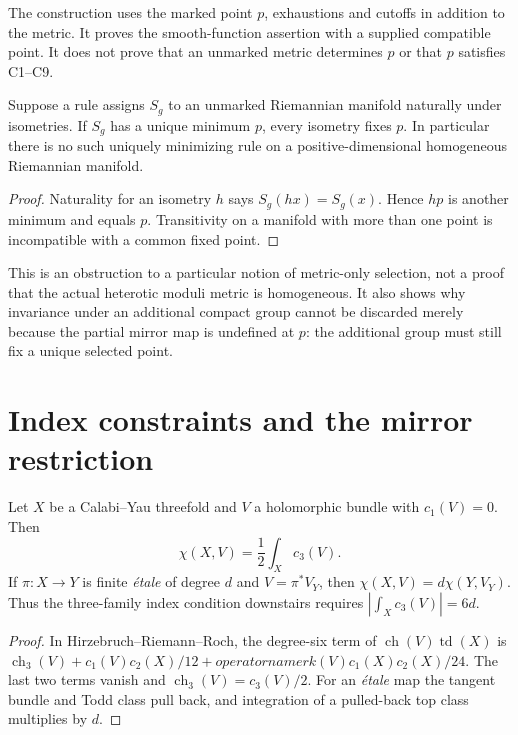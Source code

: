 \begin{remark}
The construction uses the marked point $p$, exhaustions and cutoffs in
addition to the metric. It proves the smooth-function assertion with a
supplied compatible point. It does not prove that an unmarked metric
determines $p$ or that $p$ satisfies C1--C9.
\end{remark}

\begin{proposition}
Suppose a rule assigns $S_g$ to an unmarked Riemannian manifold naturally
under isometries. If $S_g$ has a unique minimum $p$, every isometry fixes
$p$. In particular there is no such uniquely minimizing rule on a
positive-dimensional homogeneous Riemannian manifold.
\end{proposition}
\begin{proof}
Naturality for an isometry $h$ says $S_g(hx)=S_g(x)$. Hence $hp$ is
another minimum and equals $p$. Transitivity on a manifold with more
than one point is incompatible with a common fixed point.
\end{proof}
This is an obstruction to a particular notion of metric-only selection,
not a proof that the actual heterotic moduli metric is homogeneous.
It also shows why invariance under an additional compact group cannot be
discarded merely because the partial mirror map is undefined at $p$:
the additional group must still fix a unique selected point.

\section{Index constraints and the mirror restriction}
\begin{proposition}\label{prop:index}
Let $X$ be a Calabi--Yau threefold and $V$ a holomorphic bundle with
$c_1(V)=0$. Then
\[
 \chi(X,V)=\frac12\int_Xc_3(V).
\]
If $\pi:X\to Y$ is finite \emph{\'etale} of degree $d$ and
$V=\pi^*V_Y$, then $\chi(X,V)=d\chi(Y,V_Y)$. Thus the three-family
index condition downstairs requires $|\int_Xc_3(V)|=6d$.
\end{proposition}
\begin{proof}
In Hirzebruch--Riemann--Roch, the degree-six term of
$\operatorname{ch}(V)\operatorname{td}(X)$ is
$\operatorname{ch}_3(V)+c_1(V)c_2(X)/12+operatorname{rk}(V)c_1(X)c_2(X)/24$.
The last two terms vanish and $\operatorname{ch}_3(V)=c_3(V)/2$.
For an \emph{\'etale} map the tangent bundle and Todd class pull back,
and integration of a pulled-back top class multiplies by $d$.
\end{proof}

